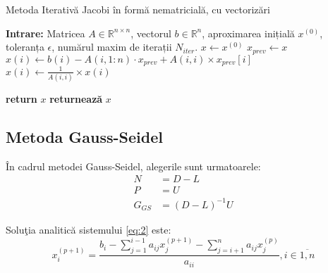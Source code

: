 \documentclass{exam}
\theoremstyle{definition}
\begin{document}
\begin{algorithm}[H]
\caption{Metoda Iterativă Jacobi în formă nematricială, cu vectorizări}
\label{alg:jacobi}
\begin{algorithmic}[1]
    \State \textbf{Intrare:} Matricea \( A \in \mathbb{R}^{n \times n} \), vectorul \( b \in \mathbb{R}^{n} \), aproximarea inițială \( x^{(0)} \), toleranța \( \epsilon \), numărul maxim de iterații \( N_{iter} \).
    \State  \( x \leftarrow x^{(0)} \) 
        \State \(x_{prev} \gets x\)
            \State \(x(i) \gets b(i) - A(i,1:n) \cdot x_{prev} + A(i,i) \times x_{prev}[i] \) 
            \State \(x(i) \gets \frac{1}{A(i,i)} \times x(i) \)
            
        \EndFor
        \State
         
            \State \textbf{return} \( x \)
        \EndIf
    \EndFor
    \State \textbf{returnează} \( x \)
\end{algorithmic}
\end{algorithm}






\subsection{Metoda Gauss-Seidel}
\par În cadrul metodei Gauss-Seidel, alegerile sunt urmatoarele:
\begin{align*}
N &= D - L \\
P &= U \\
{G}_{GS} &= {(D - L)}^{-1}U
\end{align*}




Solu\c{t}ia analitică sistemului \ref{eq:2} este:
$${x}_{i}^{(p+1)} = \frac{{b}_{i} - \sum_{j = 1}^{i-1}{a}_{ij}{x}_{j}^{(p+1)} - \sum_{j = i + 1}^{n}{a}_{ij}{x}_{j}^{(p)}}{{a}_{ii}}, i\in\overline{1, n}$$

\end{document}
